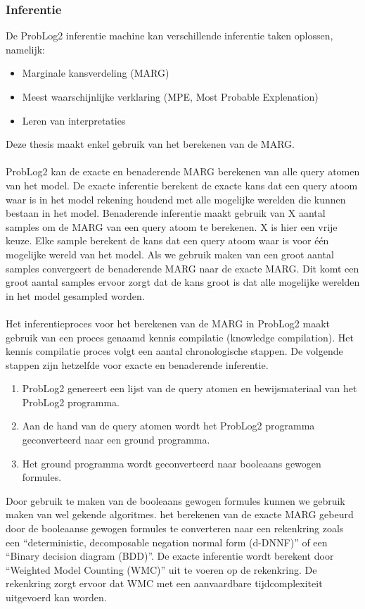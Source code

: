 \documentclass[12pt,a4paper,oneside]{book}
\theoremstyle{definition}
\newcommand{\quotes}[1]{``#1''}
\begin{document}
\subsubsection{Inferentie}
\label{subsubsec:inferentieProbLog2}
De ProbLog2 inferentie machine kan verschillende inferentie taken oplossen, namelijk:
\begin{itemize}
	\item Marginale kansverdeling (MARG)
	\item Meest waarschijnlijke verklaring (MPE, Most Probable Explenation)
	\item Leren van interpretaties
\end{itemize}
Deze thesis maakt enkel gebruik van het berekenen van de MARG.
\\\\
ProbLog2 kan de exacte en benaderende MARG berekenen van alle query atomen van het model. De exacte inferentie berekent de exacte kans dat een query atoom waar is in het model rekening houdend met alle mogelijke werelden die kunnen bestaan in het model. Benaderende inferentie maakt gebruik van X aantal samples om de MARG van een query atoom te berekenen. X is hier een vrije keuze. Elke sample berekent de kans dat een query atoom waar is voor \'{e}\'{e}n mogelijke wereld van het model. Als we gebruik maken van een groot aantal samples convergeert de benaderende MARG naar de exacte MARG. Dit komt een groot aantal samples ervoor zorgt dat de kans groot is dat alle mogelijke werelden in het model gesampled worden.
\\\\
Het inferentieproces voor het berekenen van de MARG in ProbLog2 maakt gebruik van een proces genaamd kennis compilatie (knowledge compilation). Het kennis compilatie proces volgt een aantal chronologische stappen. De volgende stappen zijn hetzelfde voor exacte en benaderende inferentie.
\begin{enumerate}
	\item ProbLog2 genereert een lijst van de query atomen en bewijsmateriaal van het ProbLog2 programma.
	\item Aan de hand van de query atomen wordt het ProbLog2 programma geconverteerd naar een ground programma.
	\item Het ground programma wordt geconverteerd naar booleaans gewogen formules.
\end{enumerate}
Door gebruik te maken van de booleaans gewogen formules kunnen we gebruik maken van wel gekende algoritmes. het berekenen van de exacte MARG gebeurd door de booleaanse gewogen formules te converteren naar een rekenkring zoals een \quotes{deterministic, decomposable negation normal form (d-DNNF)} of een \quotes{Binary decision diagram (BDD)}. De exacte inferentie wordt berekent door \quotes{Weighted Model Counting (WMC)} uit te voeren op de rekenkring. De rekenkring zorgt ervoor dat WMC met een aanvaardbare tijdcomplexiteit uitgevoerd kan worden.
\end{document}
